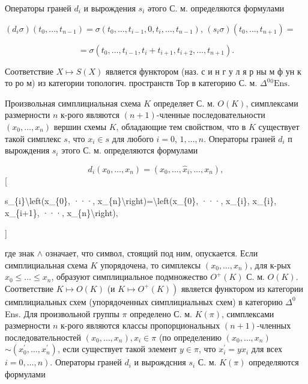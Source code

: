 \documentclass[10pt]{article}
\begin{document}
Операторы граней $d_{i}$ и вырождения $s_{i}$ әтого С. м. определяются формулами



$\left(d_{i} \sigma\right)\left(t_{0}, \ldots, t_{n-1}\right)=\sigma\left(t_{0}, \ldots, t_{i-1}, 0, t_{i}, \ldots, t_{n-1}\right)$, $\left(s_{i} \sigma\right)\left(t_{0}, \ldots, t_{n+1}\right)=$



\[

=\sigma\left(t_{0}, \ldots, t_{i-1}, t_{i}+t_{i+1}, t_{i+2}, \ldots, t_{n+1}\right) .

\]



Соответствие $X \mapsto S(X)$ является функтором (наз. с и н г у л я р ны м ф ун к то ро м) из категории топологич. пространств Тор в категорию С. м. $\Delta^{0}{ }^{0} \mathrm{Ens}$.



Произвольная симплициальная схема $K$ определяет С. м. $O(K)$, симплексами размерности $n$ к-рого являются $(n+1)$-членные последовательности $\left(x_{0}, \ldots, x_{n}\right)$ вершин схемы $K$, обладающие тем свойством, что в $K$ существует такой симплекс $s$, что $x_{i} \in s$ для любого $i=0$, $1, \ldots, n$. Операторы граней $d_{i}$ п вырождения $s_{i}$ этого С. м. определяются формулами



\[

d_{i}\left(x_{0}, \ldots, x_{n}\right)=\left(x_{0}, \ldots, \hat{x}_{i}, \ldots, x_{n}\right),

\][



s\_\{i\}\textbackslash left(x\_\{0\}, ···, x\_\{n\}\textbackslash right)=\textbackslash left(x\_\{0\}, ···, x\_\{i\}, x\_\{i\}, x\_\{i+1\}, ···, x\_\{n\}\textbackslash right),

]



где знак $\wedge$ означает, что символ, стоящий под ним, опускается. Если симплициальная схема $K$ упорядочена, то симплексы $\left(x_{0}, \ldots, x_{n}\right)$, для к-рых $x_{0} \leqslant \ldots \leqslant x_{n}$, образуют симплициальное подмножество $O^{+}(K)$ С. м. $O(K)$. Соответствие $K \mapsto O(K)$ (и $\left.K \longmapsto O^{+}(K)\right)$ является функтором из категории симплициальных схем (упорядоченных симплициальных схем) в категорию $\Delta^{0}$ Ens. Для произвольной группы $\pi$ определено С. м. $K(\pi)$, симплексами размерности $n$ к-рого являются классы пропорциональных $(n+1)$-членных последовательностей $\left(x_{0}, \ldots, x_{n}\right), x_{i} \in \pi$ (по определению $\left(x_{0}, \ldots, x_{n}\right)$ $\sim\left(x_{0}^{\prime}, \ldots, x_{n}^{\prime}\right)$, если существует такой элемент $y \in \pi$, что $x_{i}^{\prime}=y x_{i}$ для всех $\left.i=0, \ldots, n\right)$. Операторы граней $d_{i}$ и вырождсния $s_{i}$ С. м. $K(\pi)$ определяются формулами
\end{document}
